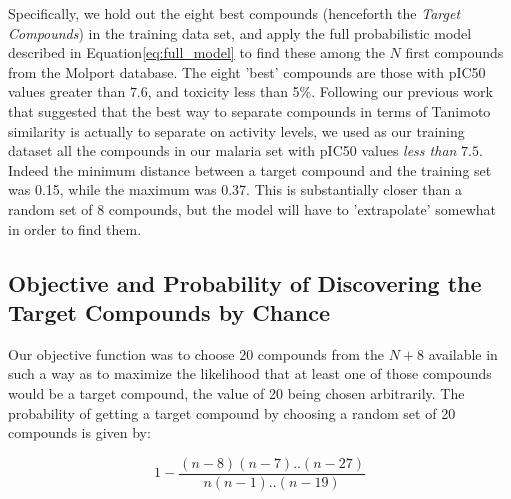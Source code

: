 \documentclass[journal=jacsat,manuscript=article]{achemso}
\begin{document}
\newline
\newline
Specifically, we hold out the eight best compounds (henceforth the \textit{Target Compounds}) in the training data set, and apply the full probabilistic model described in Equation\ref{eq:full_model} to find these among the $N$ first compounds from the Molport database. 
The eight 'best' compounds 
are those with pIC50 values greater than $7.6$, and toxicity less than 5\%. %
Following our previous work\cite{et1:} that suggested that the best way to separate compounds in terms of Tanimoto similarity is actually to separate on activity levels,
we used as our training dataset all the compounds in our malaria set with pIC50 values \textit{less than} $7.5$.
Indeed the minimum distance between a target compound and the training set was 0.15, while the maximum was 0.37.  This is substantially closer than a random set of 8 compounds, but the model will have to 'extrapolate' somewhat in order to find them.


\subsection*{Objective and Probability of Discovering the Target Compounds by Chance}

Our objective function was to choose $20$ compounds from the $N+8$ available in such a way as to maximize the likelihood that at least one of those compounds would be a target compound, the value of 20 being chosen arbitrarily.
The probability of getting a target compound by choosing a random set of 20 compounds is given by:

\begin{equation}
    1-\frac{(n-8)(n-7)..(n-27)}{n(n-1)..(n-19)}
\end{equation}
\end{document}
